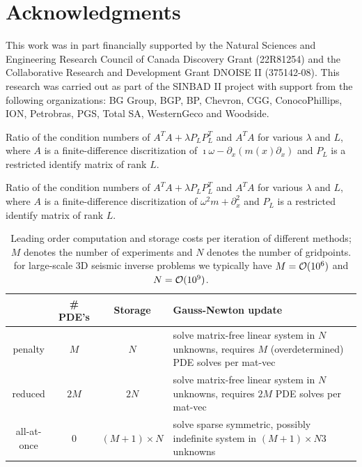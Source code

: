 \documentclass{iopart}
\begin{document}
\section*{Acknowledgments}
This work was in part financially supported by
the Natural Sciences and Engineering Research Council of Canada
Discovery Grant (22R81254) and the Collaborative Research and
Development Grant DNOISE II (375142-08). This research was carried out
as part of the SINBAD II project with support from the following
organizations: BG Group, BGP, BP, Chevron, CGG, ConocoPhillips, ION,
Petrobras, PGS, Total SA, WesternGeco and Woodside.


\clearpage

\begin{table}
\centering

\caption{Ratio of the condition numbers of $A^TA + \lambda P_LP_L^T$ and $A^TA$ for various $\lambda$ and $L$, where $A$ is a finite-difference discritization of $\imath\omega - \partial_x\left(m(x)\partial_x\right)$
and $P_L$ is a restricted identify matrix of rank $L$. }
\label{table:example2}
\end{table}

\begin{table}
\centering

\caption{Ratio of the condition numbers of $A^TA + \lambda P_LP_L^T$ and $A^TA$ for various $\lambda$ and $L$, where $A$ is a finite-difference discritization of $\omega^2 m + \partial_x^2$ and $P_L$ is a restricted identify matrix of rank $L$. }
\label{table:example3}
\end{table}

\begin{table}
\begin{tabular}{c|c|c|p{5cm}}
         & \# PDE's & Storage & Gauss-Newton update \\
\hline
penalty  &  $M$  &    $N$     & solve matrix-free linear system in $N$ unknowns, requires $M$ (overdetermined) PDE solves per mat-vec \\
\hline
reduced  &  $2M $  &    $2N$     & solve matrix-free linear system in $N$ unknowns, requires $2M$ PDE solves per mat-vec                   \\
\hline
all-at-once&   0   &    $(M+1) \times N$   &  solve sparse symmetric, possibly indefinite system in $(M + 1) \times N3$ unknowns \\ 
\end{tabular}
\caption{Leading order computation and storage costs per iteration of different methods; $M$ denotes the number of experiments and $N$ denotes the number of gridpoints.
for large-scale 3D seismic inverse problems we typically have $M = \mathcal{O}(10^6)$ and $N = \mathcal{O}(10^9)$.}
\label{table:costs}
\end{table}
\end{document}
